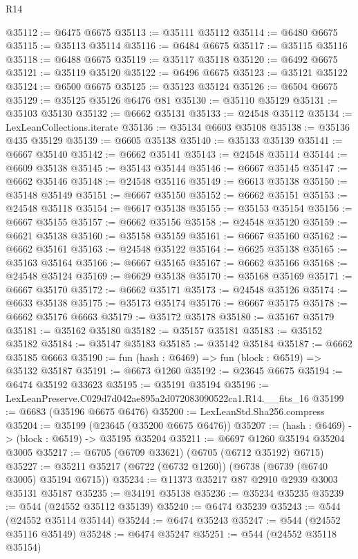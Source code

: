\begin{lexlean}{R14}
\begin{coremodule}
@35112 := @6475 @6675
@35113 := @35111 @35112
@35114 := @6480 @6675
@35115 := @35113 @35114
@35116 := @6484 @6675
@35117 := @35115 @35116
@35118 := @6488 @6675
@35119 := @35117 @35118
@35120 := @6492 @6675
@35121 := @35119 @35120
@35122 := @6496 @6675
@35123 := @35121 @35122
@35124 := @6500 @6675
@35125 := @35123 @35124
@35126 := @6504 @6675
@35129 := @35125 @35126 @6476 @81
@35130 := @35110 @35129
@35131 := @35103 @35130
@35132 := @6662 @35131
@35133 := @24548 @35112
@35134 := LexLeanCollections.iterate
@35136 := @35134 @6603 @35108
@35138 := @35136 @435 @35129
@35139 := @6605 @35138
@35140 := @35133 @35139
@35141 := @6667 @35140
@35142 := @6662 @35141
@35143 := @24548 @35114
@35144 := @6609 @35138
@35145 := @35143 @35144
@35146 := @6667 @35145
@35147 := @6662 @35146
@35148 := @24548 @35116
@35149 := @6613 @35138
@35150 := @35148 @35149
@35151 := @6667 @35150
@35152 := @6662 @35151
@35153 := @24548 @35118
@35154 := @6617 @35138
@35155 := @35153 @35154
@35156 := @6667 @35155
@35157 := @6662 @35156
@35158 := @24548 @35120
@35159 := @6621 @35138
@35160 := @35158 @35159
@35161 := @6667 @35160
@35162 := @6662 @35161
@35163 := @24548 @35122
@35164 := @6625 @35138
@35165 := @35163 @35164
@35166 := @6667 @35165
@35167 := @6662 @35166
@35168 := @24548 @35124
@35169 := @6629 @35138
@35170 := @35168 @35169
@35171 := @6667 @35170
@35172 := @6662 @35171
@35173 := @24548 @35126
@35174 := @6633 @35138
@35175 := @35173 @35174
@35176 := @6667 @35175
@35178 := @6662 @35176 @6663
@35179 := @35172 @35178
@35180 := @35167 @35179
@35181 := @35162 @35180
@35182 := @35157 @35181
@35183 := @35152 @35182
@35184 := @35147 @35183
@35185 := @35142 @35184
@35187 := @6662 @35185 @6663
@35190 := fun (hash : @6469) => fun (block : @6519) => @35132 @35187
@35191 := @6673 @1260
@35192 := @23645 @6675
@35194 := @6474 @35192 @33623
@35195 := @35191 @35194
@35196 := LexLeanPreserve.C029d7d042ae895a2d072083090522ca1.R14.__fits_16
@35199 := @6683 (@35196 @6675 @6476)
@35200 := LexLeanStd.Sha256.compress
@35204 := @35199 (@23645 (@35200 @6675 @6476))
@35207 := (hash : @6469) -> (block : @6519) -> @35195 @35204
@35211 := @6697 @1260 @35194 @35204 @3005
@35217 := @6705 (@6709 @33621) (@6705 (@6712 @35192) @6715)
@35227 := @35211 @35217 (@6722 (@6732 @1260)) (@6738 (@6739 (@6740 @3005) @35194 @6715))
@35234 := @11373 @35217 @87 @2910 @2939 @3003 @35131 @35187
@35235 := @34191 @35138
@35236 := @35234 @35235
@35239 := @544 (@24552 @35112 @35139)
@35240 := @6474 @35239
@35243 := @544 (@24552 @35114 @35144)
@35244 := @6474 @35243
@35247 := @544 (@24552 @35116 @35149)
@35248 := @6474 @35247
@35251 := @544 (@24552 @35118 @35154)

\end{coremodule}
\end{lexlean}
